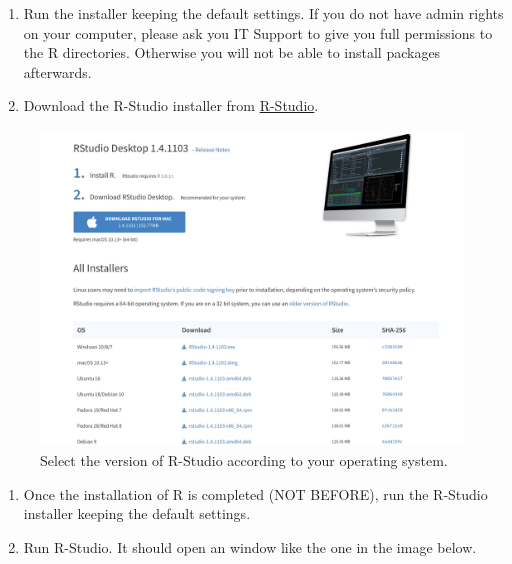 \documentclass[
]{article}
\begin{document}
\begin{enumerate}
\def\labelenumi{\arabic{enumi}.}
\setcounter{enumi}{1}
\item
  Run the installer keeping the default settings. If you do not have admin rights on your computer, please ask you IT Support to give you full permissions to the R directories. Otherwise you will not be able to install packages afterwards.
\item
  Download the R-Studio installer from \href{https://rstudio.com/products/rstudio/download/\#download}{R-Studio}.\\
\end{enumerate}

\begin{figure}[H]

{\centering \includegraphics[width=0.8\linewidth,]{images/rstudio} 

}

\caption{Select the version of R-Studio according to your operating system.}\label{fig:unnamed-chunk-3}
\end{figure}

\begin{enumerate}
\def\labelenumi{\arabic{enumi}.}
\setcounter{enumi}{3}
\item
  Once the installation of R is completed (NOT BEFORE), run the R-Studio installer keeping the default settings.
\item
  Run R-Studio. It should open an window like the one in the image below.\\
\end{enumerate}
\end{document}
